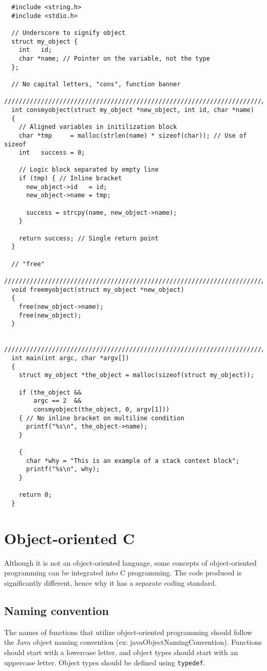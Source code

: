 \documentclass{article}
\begin{document}
\begin{lstlisting}
  #include <string.h>
  #include <stdio.h>

  // Underscore to signify object
  struct my_object {
    int   id;
    char *name; // Pointer on the variable, not the type
  };

  // No capital letters, "cons", function banner
  ////////////////////////////////////////////////////////////////////////////////
  int consmyobject(struct my_object *new_object, int id, char *name)
  {
    // Aligned variables in initilization block
    char *tmp     = malloc(strlen(name) * sizeof(char)); // Use of sizeof
    int   success = 0;

    // Logic block separated by empty line
    if (tmp) { // Inline bracket
      new_object->id   = id;
      new_object->name = tmp;

      success = strcpy(name, new_object->name);
    }

    return success; // Single return point
  }

  // "free"
  ////////////////////////////////////////////////////////////////////////////////
  void freemyobject(struct my_object *new_object)
  {
    free(new_object->name);
    free(new_object);
  }

  ////////////////////////////////////////////////////////////////////////////////
  int main(int argc, char *argv[])
  {
    struct my_object *the_object = malloc(sizeof(struct my_object));

    if (the_object && 
        argc == 2  && 
        consmyobject(the_object, 0, argv[1]))
    { // No inline bracket on multiline condition
      printf("%s\n", the_object->name);
    }

    {
      char *why = "This is an example of a stack context block";
      printf("%s\n", why);
    }

    return 0;
  }

\end{lstlisting}

\pagebreak

\section{Object-oriented C}
Although it is not an object-oriented language, some concepts of object-oriented programming can be integrated into C programming. The code produced is significantly different, hence why it has a separate coding standard.

\subsection{Naming convention}
The names of functions that utilize object-oriented programming should follow the Java object naming convention (ex: javaObjectNamingConvention). Functions should start with a lowercase letter, and object types should start with an uppercase letter. Object types should be defined using \texttt{typedef}.
\end{document}
